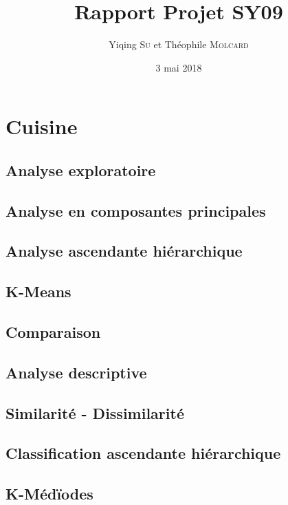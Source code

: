\documentclass[a4paper, titlepage]{report}
\title{Rapport Projet SY09}
\date{3 mai 2018}
\author{Yiqing \textsc{Su} et Théophile \textsc{Molcard}}
\begin{document}
\renewcommand{\chaptername}{Partie}


\maketitle

\tableofcontents



\chapter{Cuisine}


\section{Analyse exploratoire}

\section{Analyse en composantes principales}

\section{Analyse ascendante hiérarchique}

\section{K-Means}

\section{Comparaison}

\section{Analyse descriptive}

\section{Similarité - Dissimilarité}

\section{Classification ascendante hiérarchique}

\section{K-Médïodes}
\end{document}
